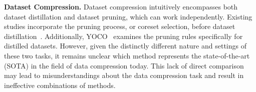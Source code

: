 \textbf{Dataset Compression.}
Dataset compression intuitively encompasses both dataset distillation and dataset pruning, which can work independently. Existing studies incorporate the pruning process, or coreset selection, before dataset distillation~\cite{liu2023dream, xu2025distill, moser2024distill, shen2024deltsimplediversitydrivenearlylate}. Additionally, YOCO~\cite{he2024you} examines the pruning rules specifically for distilled datasets. However, given the distinctly different nature and settings of these two tasks, it remains unclear which method represents the state-of-the-art (SOTA) in the field of data compression today. This lack of direct comparison may lead to misunderstandings about the data compression task and result in ineffective combinations of methods.